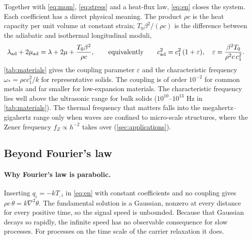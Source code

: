 Together with \eqref{eq:mom}, \eqref{eq:stress} and a heat-flux law, \eqref{eq:en} closes the system. Each coefficient has a direct physical meaning. The product $\rho c$ is the heat capacity per unit volume at constant strain; $T_0\beta^2/(\rho c)$ is the difference between the adiabatic and isothermal longitudinal moduli,
\begin{equation}
\lambda_{\rm ad}+2\mu_{\rm ad}=\lambda+2\mu+\frac{T_0\beta^2}{\rho c},
\qquad\text{equivalently}\qquad c_{\rm ad}^2=c_1^2\,(1+\varepsilon),\quad \varepsilon=\frac{\beta^2T_0}{\rho^2c\,c_1^2}. \label{eq:adiabatic}
\end{equation}
\cref{tab:materials} gives the coupling parameter $\varepsilon$ and the characteristic frequency $\omega_*=\rho c c_1^2/k$ for representative solids. The coupling is of order $10^{-2}$ for common metals and far smaller for low-expansion materials. The characteristic frequency lies well above the ultrasonic range for bulk solids ($10^{10}$--$10^{13}$ Hz in \cref{tab:materials}). The thermal frequency that matters falls into the megahertz--gigahertz range only when waves are confined to micro-scale structures, where the Zener frequency $f_Z\propto h^{-2}$ takes over (\cref{sec:applications}).
\begin{table}[ht]\centering\small
\caption{Thermoelastic coupling $\varepsilon$ and characteristic frequency $f_*=\omega_*/2\pi$ computed from rounded handbook-type values (300\,K) of density, specific heat, conductivity, expansion coefficient, Young's modulus and Poisson ratio; the reader should replace them by data for the specimen at hand.}\label{tab:materials}

\end{table}

\subsection{Beyond Fourier's law}\label{sec:beyond}
\paragraph{Why Fourier's law is parabolic.} Inserting $q_i=-kT_{,i}$ in \eqref{eq:en} with constant coefficients and no coupling gives $\rho c\,\dot\theta=k\nabla^2\theta$. The fundamental solution is a Gaussian, nonzero at every distance for every positive time, so the signal speed is unbounded. Because that Gaussian decays so rapidly, the infinite speed has no observable consequence for slow processes. For processes on the time scale of the carrier relaxation it does.

